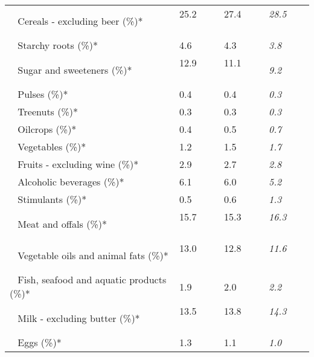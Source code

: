 \begin{tabular}{L{3.9cm} R{1cm} R{1cm} R{1cm}}
	 ~ Cereals - excluding beer (\%)* & 25.2 ~ \ \ & 27.4 ~ \ \ & \textit{28.5} ~ \ \ \\ 
	 ~ Starchy roots (\%)* & 4.6 ~ \ \ & 4.3 ~ \ \ & \textit{3.8} ~ \ \ \\ 
	 ~ Sugar and sweeteners (\%)* & 12.9 ~ \ \ & 11.1 ~ \ \ & \textit{9.2} ~ \ \ \\ 
	 ~ Pulses (\%)* & 0.4 ~ \ \ & 0.4 ~ \ \ & \textit{0.3} ~ \ \ \\ 
	 ~ Treenuts (\%)* & 0.3 ~ \ \ & 0.3 ~ \ \ & \textit{0.3} ~ \ \ \\ 
	 ~ Oilcrops (\%)* & 0.4 ~ \ \ & 0.5 ~ \ \ & \textit{0.7} ~ \ \ \\ 
	 ~ Vegetables (\%)* & 1.2 ~ \ \ & 1.5 ~ \ \ & \textit{1.7} ~ \ \ \\ 
	 ~ Fruits - excluding wine (\%)* & 2.9 ~ \ \ & 2.7 ~ \ \ & \textit{2.8} ~ \ \ \\ 
	 ~ Alcoholic beverages (\%)* & 6.1 ~ \ \ & 6.0 ~ \ \ & \textit{5.2} ~ \ \ \\ 
	 ~ Stimulants (\%)* & 0.5 ~ \ \ & 0.6 ~ \ \ & \textit{1.3} ~ \ \ \\ 
	 ~ Meat and offals (\%)* & 15.7 ~ \ \ & 15.3 ~ \ \ & \textit{16.3} ~ \ \ \\ 
	 ~ Vegetable oils and animal fats (\%)* & 13.0 ~ \ \ & 12.8 ~ \ \ & \textit{11.6} ~ \ \ \\ 
	 ~ Fish, seafood and aquatic products (\%)* & 1.9 ~ \ \ & 2.0 ~ \ \ & \textit{2.2} ~ \ \ \\ 
	 ~ Milk - excluding butter (\%)* & 13.5 ~ \ \ & 13.8 ~ \ \ & \textit{14.3} ~ \ \ \\ 
	 ~ Eggs (\%)* & 1.3 ~ \ \ & 1.1 ~ \ \ & \textit{1.0} ~ \ \ \\ 
       \toprule
      \end{tabular}
      \clearpage
{}
